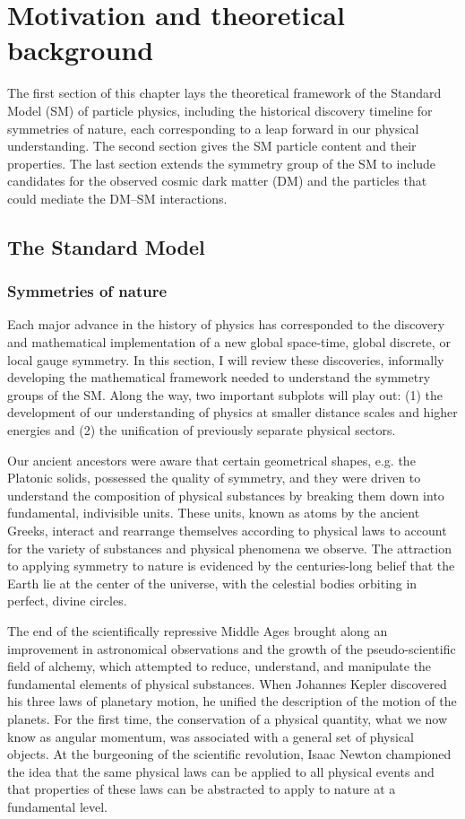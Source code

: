 \chapter{Motivation and theoretical background}

The first section of this chapter lays the theoretical framework of the Standard Model (SM) of particle physics, including the historical discovery timeline for symmetries of nature, each corresponding to a leap forward in our physical understanding. The second section gives the SM particle content and their properties. The last section extends the symmetry group of the SM to include candidates for the observed cosmic dark matter (DM) and the particles that could mediate the DM--SM interactions.

\section{The Standard Model}

\subsection{Symmetries of nature}

Each major advance in the history of physics has corresponded to the discovery and mathematical implementation of a new global space-time, global discrete, or local gauge symmetry. In this section, I will review these discoveries, informally developing the mathematical framework needed to understand the symmetry groups of the SM. Along the way, two important subplots will play out: (1) the development of our understanding of physics at smaller distance scales and higher energies and (2) the unification of previously separate physical sectors.

\indent Our ancient ancestors were aware that certain geometrical shapes, e.g. the Platonic solids, possessed the quality of symmetry, and they were driven to understand the composition of physical substances by breaking them down into fundamental, indivisible units. These units, known as atoms by the ancient Greeks, interact and rearrange themselves according to physical laws to account for the variety of substances and physical phenomena we observe. The attraction to applying symmetry to nature is evidenced by the centuries-long belief that the Earth lie at the center of the universe, with the celestial bodies orbiting in perfect, divine circles.

\indent The end of the scientifically repressive Middle Ages brought along an improvement in astronomical observations and the growth of the pseudo-scientific field of alchemy, which attempted to reduce, understand, and manipulate the fundamental elements of physical substances. When Johannes Kepler discovered his three laws of planetary motion, he unified the description of the motion of the planets. For the first time, the conservation of a physical quantity, what we now know as angular momentum, was associated with a general set of physical objects. At the burgeoning of the scientific revolution, Isaac Newton championed the idea that the same physical laws can be applied to all physical events and that properties of these laws can be abstracted to apply to nature at a fundamental level.

